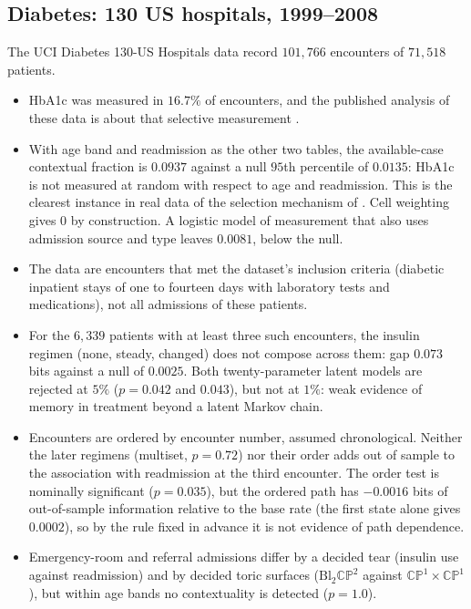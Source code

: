 \documentclass[11pt]{article}
\theoremstyle{definition}
\theoremstyle{remark}
\begin{document}
\subsection{Diabetes: 130 US hospitals, 1999--2008}

The UCI Diabetes 130-US Hospitals data \cite{Strack2014,UCIDiabetes} record $101{,}766$ encounters of $71{,}518$ patients.
\begin{itemize}[leftmargin=*,nosep]
\item HbA1c was measured in $16.7\%$ of encounters, and the published analysis of these data is about that selective measurement
  \cite{Strack2014}.
\item With age band and readmission as the other two tables, the available-case contextual fraction is $0.0937$ against a null $95$th
  percentile of $0.0135$: HbA1c is not measured at random with respect to age and readmission. This is the clearest instance in real
  data of the selection mechanism of \cite[\S11]{Bands}. Cell weighting gives $0$ by construction. A logistic model of measurement that
  also uses admission source and type leaves $0.0081$, below the null.
\item The data are encounters that met the dataset's inclusion criteria (diabetic inpatient stays of one to fourteen days with
  laboratory tests and medications), not all admissions of these patients.
\item For the $6{,}339$ patients with at least three such encounters, the insulin regimen (none, steady, changed) does not compose across
  them: gap $0.073$ bits against a null of $0.0025$. Both twenty-parameter latent models are rejected at $5\%$ ($p=0.042$ and $0.043$),
  but not at $1\%$: weak evidence of memory in treatment beyond a latent Markov chain.
\item Encounters are ordered by encounter number, assumed chronological. Neither the later regimens (multiset, $p=0.72$) nor their order
  adds out of sample to the association with readmission at the third encounter. The order test is nominally significant ($p=0.035$),
  but the ordered path has $-0.0016$ bits of out-of-sample information relative to the base rate (the first state alone gives $0.0002$), so by the rule fixed in advance it is not
  evidence of path dependence.
\item Emergency-room and referral admissions differ by a decided tear (insulin use against readmission) and by decided toric surfaces
  ($\mathrm{Bl}_2\mathbb{CP}^2$ against $\mathbb{CP}^1\times\mathbb{CP}^1$), but within age bands no contextuality is detected ($p=1.0$).
\end{itemize}
\end{document}
